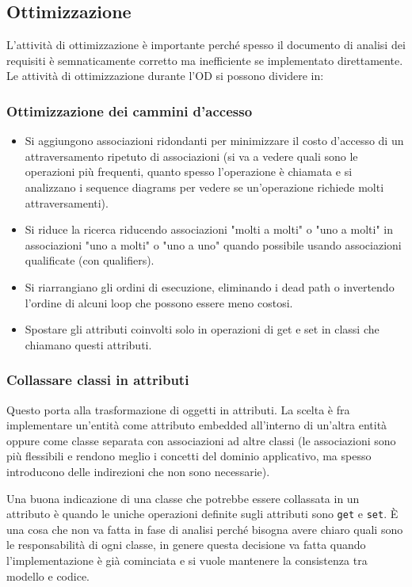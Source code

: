         \subsection{Ottimizzazione}
            L'attività di ottimizzazione è importante perché spesso il documento di analisi dei requisiti è semnaticamente corretto ma inefficiente se implementato direttamente. Le attività di ottimizzazione durante l'OD si possono dividere in:
            
            \subsubsection{Ottimizzazione dei cammini d'accesso}
                \begin{itemize}
                    \item Si aggiungono associazioni ridondanti per minimizzare il costo d'accesso di un attraversamento ripetuto di associazioni (si va a vedere quali sono le operazioni più frequenti, quanto spesso l'operazione è chiamata e si analizzano i sequence diagrams per vedere se un'operazione richiede molti attraversamenti).
                    \item Si riduce la ricerca riducendo associazioni "molti a molti" o "uno a molti" in associazioni "uno a molti" o "uno a uno" quando possibile usando associazioni qualificate (con qualifiers).
                    \item Si riarrangiano gli ordini di esecuzione, eliminando i dead path o invertendo l'ordine di alcuni loop che possono essere meno costosi.
                    \item Spostare gli attributi coinvolti solo in operazioni di get e set in classi che chiamano questi attributi.
                \end{itemize}
                
            \subsubsection{Collassare classi in attributi}
                Questo porta alla trasformazione di oggetti in attributi. La scelta è fra implementare un'entità come attributo embedded all'interno di un'altra entità oppure come classe separata con associazioni ad altre classi (le associazioni sono più flessibili e rendono meglio i concetti del dominio applicativo, ma spesso introducono delle indirezioni che non sono necessarie).
                    
                Una buona indicazione di una classe che potrebbe essere collassata in un attributo è quando le uniche operazioni definite sugli attributi sono \texttt{get} e \texttt{set}. È una cosa che non va fatta in fase di analisi perché bisogna avere chiaro quali sono le responsabilità di ogni classe, in genere questa decisione va fatta quando l'implementazione è già cominciata e si vuole mantenere la consistenza tra modello e codice.
                    
